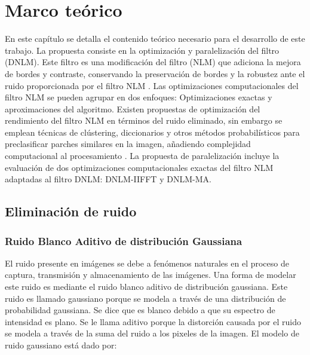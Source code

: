 \chapter{Marco teórico}
\label{ch:marco}


En este cap\'itulo se detalla el contenido te\'orico necesario para el desarrollo de este trabajo. La propuesta consiste en la optimizaci\'on y paralelizaci\'on del filtro  (DNLM). Este filtro es una modificaci\'on del filtro  (NLM) que adiciona la mejora de bordes y contraste, conservando la preservaci\'on de bordes y la robustez ante el ruido proporcionada por el filtro NLM \cite{calderon2015dewaff}. 
Las optimizaciones computacionales del filtro NLM se pueden agrupar en dos enfoques: Optimizaciones exactas y aproximaciones del algoritmo. Existen propuestas de optimizaci\'on del rendimiento del filtro NLM en t\'erminos del ruido eliminado, sin embargo se emplean t\'ecnicas de cl\'ustering, diccionarios y otros m\'etodos probabil\'isticos para preclasificar parches similares en la imagen, a\~nadiendo complejidad computacional al procesamiento \cite{pardoNLM:2018,Chan2013,Tasdizen2009,Chatterjee2008,JI20091238,Karam2018}. 
La propuesta de paralelizaci\'on incluye la evaluaci\'on de dos optimizaciones computacionales exactas del filtro NLM adaptadas al filtro DNLM: DNLM-IIFFT y DNLM-MA.



\section{Eliminaci\'on de ruido}

\subsection{Ruido Blanco Aditivo de distribuci\'on Gaussiana}
\label{ch:marco_agwn}

El ruido presente en im\'agenes se debe a fen\'omenos naturales en el proceso de captura, transmisi\'on y almacenamiento de las im\'agenes. 	Una forma de modelar este ruido es mediante el ruido blanco aditivo de distribuci\'on gaussiana. Este ruido es llamado gaussiano porque se modela a trav\'es de una distribuci\'on de probabilidad gaussiana. Se dice que es blanco debido a que su espectro de intensidad es plano. Se le llama aditivo porque la distorci\'on causada por el ruido se modela a trav\'es de la suma del ruido a los pixeles de la imagen. El modelo de ruido gaussiano  est\'a dado por:

